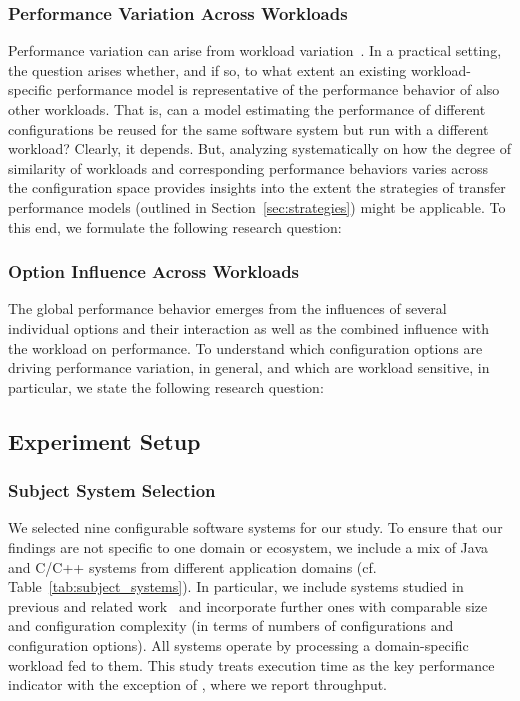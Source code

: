 {\subsubsection{Performance Variation Across Workloads}
Performance variation can arise from workload variation~\cite{benchmarking_book}. In a practical setting, the question arises whether, and if so, to what extent an existing workload-specific performance model is representative of the performance behavior of also other workloads. 
That is, can a model estimating the performance of different configurations be reused for the same software system but run with a different workload? 
Clearly, it depends. But, analyzing systematically on how the degree of similarity of workloads and corresponding performance behaviors varies across the configuration space provides insights into the extent the strategies of transfer performance models (outlined in Section~\ref{sec:strategies}) might be applicable.
To this end, we formulate the following research question: 

\subsubsection{Option Influence Across Workloads}
The global performance behavior emerges from the influences of several individual options and their interaction as well as the combined influence with the workload on performance. To understand which configuration options are driving performance variation, in general, and which are workload sensitive, in particular, we state the following research question:


\subsection{Experiment Setup}\label{sec:setup}
\subsubsection{Subject System Selection}
{\color{black}
We selected nine configurable software systems for our study. To ensure that our findings are not specific to one domain or ecosystem, we include a mix of Java and C/C++ systems from different application domains (cf. Table~\ref{tab:subject_systems}). In particular, we include systems studied in previous and related work~\cite{velez_2020_configcrusher_jase,weber_white_2021,alves_sampling_2020} and incorporate further ones with comparable size and configuration complexity (in terms of numbers of configurations and configuration options). All systems operate by processing a domain-specific workload fed to them. This study treats execution time as the key performance indicator with the exception of \htwo, where we report throughput.

}}
